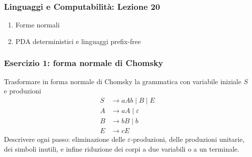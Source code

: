 




\begin{frame}[fragile]
        \frametitle{Linguaggi e Computabilità: Lezione 20}
\begin{enumerate}
\item
      Forme normali
\item PDA deterministici e linguaggi prefix-free
\end{enumerate}
\end{frame}


\begin{frame}[fragile]
        \frametitle{Esercizio 1: forma normale di Chomsky}
Trasformare in forma normale di Chomsky la grammatica con variabile iniziale $S$ e produzioni
\begin{align*}
S & \to aAb \mid B \mid E\\
A & \to aA \mid \varepsilon\\
B & \to bB \mid b\\
E & \to cE
\end{align*}
Descrivere ogni passo: eliminazione delle $\varepsilon$-produzioni, delle produzioni unitarie,
dei simboli inutili, e infine riduzione dei corpi a due variabili o a un terminale.
\end{frame}


